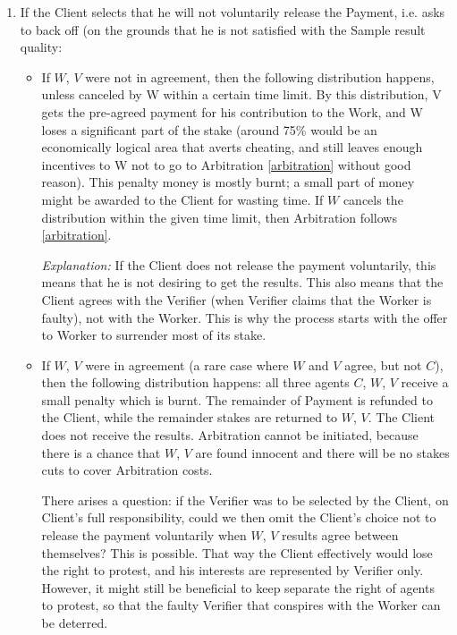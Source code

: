 \documentclass[conference]{IEEEtran}
\begin{document}
\begin{enumerate}
    \item If the Client selects that he will not voluntarily release the Payment, i.e. asks to back off (on the grounds that he is not satisfied with the Sample result quality:
        \begin{itemize}
            \item If $W$, $V$ were not in agreement, then the following distribution happens, unless canceled by W within a certain time limit. By this distribution, V gets the pre-agreed payment for his contribution to the Work, and W loses a significant part of the stake (around 75\% would be an economically logical area that averts cheating, and still leaves enough incentives to W not to go to Arbitration \ref{arbitration} without good reason). This penalty money is mostly burnt; a small part of money might be awarded to the Client for wasting time. If $W$ cancels the distribution within the given time limit, then Arbitration follows \ref{arbitration}.
            
            \textit{Explanation:} If the Client does not release the payment voluntarily, this means that he is not desiring to get the results. This also means that the Client agrees with the Verifier (when Verifier claims that the Worker is faulty), not with the Worker. This is why the process starts with the offer to Worker to surrender most of its stake.
            
            \item If $W$, $V$ were in agreement (a rare case where $W$ and $V$ agree, but not $C$), then the following distribution happens: all three agents $C$, $W$, $V$ receive a small penalty which is burnt. The remainder of Payment is refunded to the Client, while the remainder stakes are returned to $W$, $V$. The Client does not receive the results. Arbitration cannot be initiated, because there is a chance that $W$, $V$ are found innocent and there will be no stakes cuts to cover Arbitration costs. 
            
            There arises a question: if the Verifier was to be selected by the Client, on Client's full responsibility, could we then omit the Client's choice not to release the payment voluntarily when $W$, $V$ results agree between themselves? This is possible. That way the Client effectively would lose the right to protest, and his interests are represented by Verifier only. However, it might still be beneficial to keep separate the right of agents to protest, so that the faulty Verifier that conspires with the Worker can be deterred.
        \end{itemize}


\end{enumerate}
\end{document}
